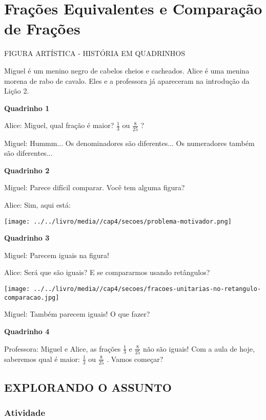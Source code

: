 \documentclass[a4,12pt]{book}
\begin{document}
\chapter{Frações Equivalentes e Comparação de Frações }
\setcounter{subsection}{0}

\begin{imagem*}[breakable]{}{}   FIGURA ARTÍSTICA -  
  HISTÓRIA EM QUADRINHOS  
  
  Miguel é um menino negro de cabelos cheios e cacheados. Alice é uma menina morena de rabo de cavalo. Eles e a professora já apareceram na introdução da Lição 2.  
  
  {\bf Quadrinho 1}  
  
  Alice: Miguel, qual fração é maior?   $\frac{1}{3}$   ou   $\frac{8}{25}$  ?  
  
  Miguel: Hummm... Os denominadores são diferentes... Os numeradores também são diferentes...  
  
  {\bf Quadrinho 2}  
  
  Miguel: Parece difícil comparar. Você tem alguma figura?  
  
  Alice: Sim, aqui está:  
  
    \texttt{[image: ../../livro/media//cap4/secoes/problema-motivador.png]}  
  
  {\bf Quadrinho 3}  
  
  Miguel: Parecem iguais na figura!  
  
  Alice: Será que são iguais? E se compararmos usando retângulos?  
  
    \texttt{[image: ../../livro/media//cap4/secoes/fracoes-unitarias-no-retangulo-comparacao.jpg]}  
  
  Miguel: Também parecem iguais! O que fazer?  
     
  {\bf Quadrinho 4}  
  
  Professora: Miguel e Alice, as frações   $\frac{1}{3}$   e   $\frac{8}{25}$   não são iguais! Com a aula de hoje, saberemos qual é maior:    $\frac{1}{3}$   ou   $\frac{8}{25}$  . Vamos começar?  
\end{imagem*}


\section{EXPLORANDO O ASSUNTO }

\subsection{Atividade}
\end{document}
